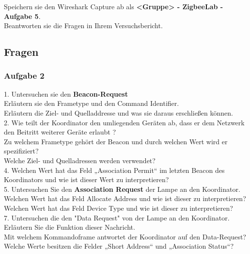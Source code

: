 \begin{Aufgabe}
    Speichern sie den Wireshark Capture ab als \textbf{\grqq <Gruppe> - ZigbeeLab - Aufgabe 5\grqq{}}. \\
    Beantworten sie die Fragen in Ihrem Versuchsbericht.
\end{Aufgabe}


\subsection{Fragen}
\subsubsection{Aufgabe 2}

\begin{Fragen}
    1. Untersuchen sie den \textbf{Beacon-Request}\\
    Erläutern sie den Frametype und den Command Identifier.\\ 
    Erläutern die Ziel- und Quelladdresse und was sie daraus erschließen können.\\
    
    2. Wie teilt der Koordinator den umliegenden Geräten ab, dass er dem Netzwerk den Beitritt weiterer Geräte erlaubt ?\\
    Zu welchem Frametype gehört der Beacon und durch welchen Wert wird er spezifiziert?\\
    Welche Ziel- und Quelladressen werden verwendet?\\
    
    4. Welchen Wert hat das Feld „Association Permit“ im letzten Beacon des Koordinators und wie ist dieser Wert zu interpretieren? \\
    
    5. Untersuchen Sie den \textbf{Association Request} der Lampe an den Koordinator. \\
    Welchen Wert hat das Feld \grqq Allocate Address \grqq{} und wie ist dieser zu interpretieren?\\
    Welchen Wert hat das Feld \grqq Device Type\grqq{} und wie ist dieser zu interpretieren?\\
    
    7. Untersuchen die den "Data Request" von der Lampe an den Koordinator.\\
    Erläutern Sie die Funktion dieser Nachricht.\\
    Mit welchem Kommandoframe antwortet der Koordinator auf den Data-Request?\\
    Welche Werte besitzen die Felder „Short Address“ und „Association Status“?\\
    

\end{Fragen}
